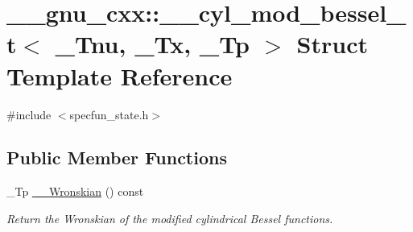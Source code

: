 \hypertarget{struct____gnu__cxx_1_1____cyl__mod__bessel__t}{}\section{\+\_\+\+\_\+gnu\+\_\+cxx\+:\+:\+\_\+\+\_\+cyl\+\_\+mod\+\_\+bessel\+\_\+t$<$ \+\_\+\+Tnu, \+\_\+\+Tx, \+\_\+\+Tp $>$ Struct Template Reference}
\label{struct____gnu__cxx_1_1____cyl__mod__bessel__t}


{\ttfamily \#include $<$specfun\+\_\+state.\+h$>$}

\subsection*{Public Member Functions}
\begin{DoxyCompactItemize}
\item 
\+\_\+\+Tp \hyperlink{struct____gnu__cxx_1_1____cyl__mod__bessel__t_a2d749bdb73113f58dc1fbf55a3e83602}{\+\_\+\+\_\+\+Wronskian} () const 
\begin{DoxyCompactList}\small\item\em Return the Wronskian of the modified cylindrical Bessel functions. \end{DoxyCompactList}\end{DoxyCompactItemize}
